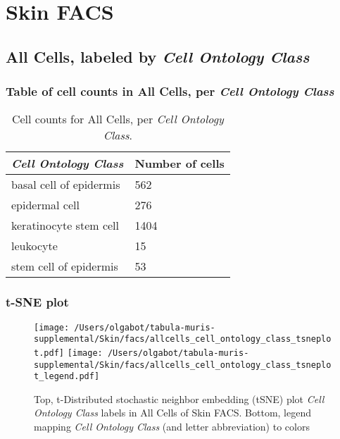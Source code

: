 \clearpage
\section{Skin FACS}

\subsection{All Cells, labeled by \emph{Cell Ontology Class}}
\subsubsection{Table of cell counts in All Cells, per \emph{Cell Ontology Class}}\begin{table}[h]
\centering
\label{my-label}
\begin{tabular}{@{}ll@{}}
\toprule

\emph{Cell Ontology Class}& Number of cells \\ \midrule
basal cell of epidermis & 562 \\

epidermal cell & 276 \\

keratinocyte stem cell & 1404 \\

leukocyte & 15 \\

stem cell of epidermis & 53 \\
\bottomrule
\end{tabular}
\caption{Cell counts for All Cells, per \emph{Cell Ontology Class}.}
\end{table}

\clearpage
\subsubsection{t-SNE plot}
\begin{figure}[h]
\centering
\texttt{[image: /Users/olgabot/tabula-muris-supplemental/Skin/facs/allcells\_cell\_ontology\_class\_tsneplot.pdf]}
\texttt{[image: /Users/olgabot/tabula-muris-supplemental/Skin/facs/allcells\_cell\_ontology\_class\_tsneplot\_legend.pdf]}
\caption{Top, t-Distributed stochastic neighbor embedding (tSNE) plot  \emph{Cell Ontology Class} labels in All Cells of Skin FACS. Bottom, legend mapping \emph{Cell Ontology Class} (and letter abbreviation) to colors}
\end{figure}


\clearpage

